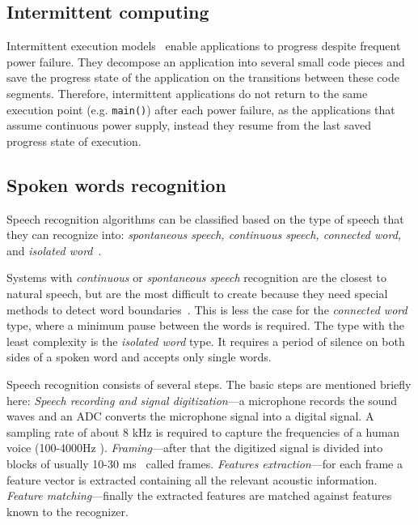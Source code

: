 \subsection{Intermittent computing}
Intermittent execution models~\cite{van2016intermittent,colin2016chain,lucia2015simpler,bhatti2017harvos} enable applications to progress despite frequent power failure. They decompose an application into several small code pieces and save the progress state of the application on the transitions between these code segments. Therefore, intermittent applications do not return to the same execution point (e.g. \texttt{main()}) after each power failure, as the applications that assume continuous power supply, instead they resume from the last saved progress state of execution.   
\subsection{Spoken words recognition}
Speech recognition algorithms can be classified based on the type of speech that they can recognize into: \textit{spontaneous speech, continuous speech, connected word,} and \textit{isolated word}~\cite{gaikwad2010review}.

Systems with \textit{continuous} or \textit{spontaneous speech} recognition are the closest to natural speech, but are the most difficult to create because they need special methods to detect word boundaries~\cite{gaikwad2010review}. This is less the case for the \textit{connected word} type, where a minimum pause between the words is required.
 The type with the least complexity is the \textit{isolated word} type. It requires a period of silence on both sides of a spoken word and accepts only single words. 

Speech recognition consists of several steps. The basic steps are mentioned briefly here:
\textit{Speech recording and signal digitization}---a microphone records the sound waves and an ADC converts the microphone signal into a digital signal. A sampling rate of about 8 kHz is required to capture the frequencies of a human voice (100-4000Hz \cite{Bernal-Ruiz2005}). \textit{Framing}---after that the digitized signal is divided into blocks of usually 10-30 ms~\cite{gaikwad2010review,delaney2002low,delaney2005energy} called frames. \textit{Features extraction}---for each frame a feature vector is extracted containing all the relevant acoustic information. \textit{Feature matching}---finally the extracted features are matched against features known to the recognizer. 


